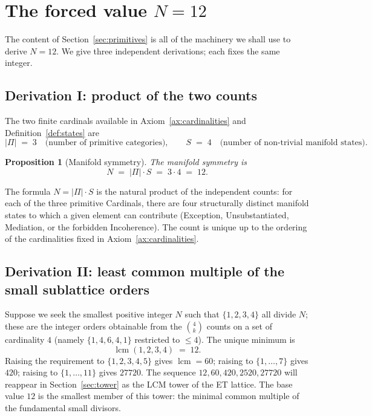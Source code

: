 \documentclass[11pt,a4paper]{article}
\newtheorem{proposition}[theorem]{Proposition}
\theoremstyle{definition}
\theoremstyle{remark}
\DeclareMathOperator{\lcm}{lcm}
\begin{document}
\section{The forced value \texorpdfstring{$N=12$}{N=12}}\label{sec:N12}

The content of Section~\ref{sec:primitives} is all of the machinery we shall use to derive $N=12$. We give three independent derivations; each fixes the same integer.

\subsection{Derivation I: product of the two counts}

The two finite cardinals available in Axiom~\ref{ax:cardinalities} and Definition~\ref{def:states} are
\[
|\Pi| \;=\; 3 \quad\text{(number of primitive categories)}, \qquad S \;=\; 4 \quad\text{(number of non-trivial manifold states)}.
\]

\begin{proposition}[Manifold symmetry]\label{prop:N12}
The \emph{manifold symmetry} is
\[
N \;=\; |\Pi|\cdot S \;=\; 3\cdot 4 \;=\; 12.
\]
\end{proposition}

The formula $N = |\Pi|\cdot S$ is the natural product of the independent counts: for each of the three primitive Cardinals, there are four structurally distinct manifold states to which a given element can contribute (Exception, Unsubstantiated, Mediation, or the forbidden Incoherence). The count is unique up to the ordering of the cardinalities fixed in Axiom~\ref{ax:cardinalities}.

\subsection{Derivation II: least common multiple of the small sublattice orders}

Suppose we seek the smallest positive integer $N$ such that $\{1,2,3,4\}$ all divide $N$; these are the integer orders obtainable from the $\binom{4}{k}$ counts on a set of cardinality $4$ (namely $\{1,4,6,4,1\}$ restricted to $\le 4$). The unique minimum is
\[
\lcm(1,2,3,4) \;=\; 12.
\]
Raising the requirement to $\{1,2,3,4,5\}$ gives $\lcm=60$; raising to $\{1,\ldots,7\}$ gives $420$; raising to $\{1,\ldots,11\}$ gives $27720$. The sequence $12,60,420,2520,27720$ will reappear in Section~\ref{sec:tower} as the LCM tower of the ET lattice. The base value $12$ is the smallest member of this tower: the minimal common multiple of the fundamental small divisors.
\end{document}
